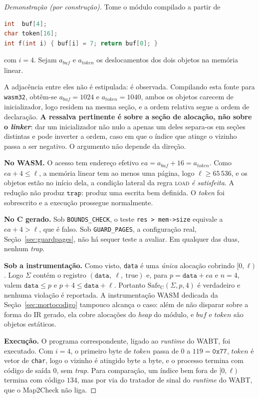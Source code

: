 \documentclass[11pt,a4paper]{article}
\theoremstyle{definition}
\newcommand{\Safe}{\mathrm{Safe}}
\newcommand{\code}[1]{\texttt{#1}}
\begin{document}
\begin{proof}[Demonstração (por construção)]
Tome o módulo compilado a partir de

\begin{lstlisting}[language=C]
int  buf[4];
char token[16];
int f(int i) { buf[i] = 7; return buf[0]; }
\end{lstlisting}

\noindent
com $i = 4$. Sejam $a_{\mathit{buf}}$ e $a_{\mathit{token}}$ os deslocamentos dos
dois objetos na memória linear.

A adjacência entre eles não é estipulada: é observada. Compilando esta fonte para
\code{wasm32}, obtêm-se $a_{\mathit{buf}} = 1024$ e $a_{\mathit{token}} = 1040$,
ambos os objetos carecem de inicializador, logo residem na mesma seção, e a
ordem relativa segue a ordem de declaração. \textbf{A ressalva pertinente é sobre
a seção de alocação, não sobre o \emph{linker}}: dar um inicializador não nulo a
apenas um deles separa-os em seções distintas e pode inverter a ordem, caso em
que o índice que atinge o vizinho passa a ser negativo. O argumento não depende
da direção.

\medskip
\noindent\textbf{No WASM.}
O acesso tem endereço efetivo $ea = a_{\mathit{buf}} + 16 = a_{\mathit{token}}$.
Como $ea + 4 \le \ell$, a memória linear tem ao menos uma página, logo
$\ell \ge 65\,536$, e os objetos estão no início dela, a condição lateral da
regra \textsc{load} \emph{é satisfeita}. A redução não produz $\mathtt{trap}$:
produz uma escrita bem definida. O \emph{token} foi sobrescrito e a execução
prossegue normalmente.

\medskip
\noindent\textbf{No C gerado.}
Sob \code{BOUNDS\_CHECK}, o teste \code{res > mem->size} equivale a
$ea + 4 > \ell$, que é falso. Sob \code{GUARD\_PAGES}, a configuração real,
Seção~\ref{sec:guardpages}, não há sequer teste a avaliar. Em qualquer das
duas, nenhum \emph{trap}.

\medskip
\noindent\textbf{Sob a instrumentação.}
Como visto, \code{data} é uma \emph{única} alocação cobrindo $[0,\ell)$. Logo
$\Sigma$ contém o registro $(\code{data},\ \ell,\ \mathrm{true})$ e, para
$p = \code{data} + ea$ e $n = 4$, valem $\code{data} \le p$ e
$p + 4 \le \code{data} + \ell$. Portanto $\Safe_{\mathrm{C}}(\Sigma, p, 4)$ é
verdadeiro e nenhuma violação é reportada. A instrumentação WASM dedicada da
Seção~\ref{sec:mortocodigo} tampouco alcança o caso: além de não disparar sobre
a forma do IR gerado, ela cobre alocações do \emph{heap} do módulo, e
$\mathit{buf}$ e $\mathit{token}$ são objetos estáticos.

\medskip
\noindent\textbf{Execução.}
O programa correspondente, ligado ao \emph{runtime} do WABT, foi executado. Com
$i = 4$, o primeiro byte de $\mathit{token}$ passa de $0$ a $119 = \mathtt{0x77}$,
$\mathit{token}$ é vetor de \code{char}, logo o vizinho é atingido byte a
byte, e o processo termina com código de saída $0$, sem \emph{trap}. Para
comparação, um índice bem fora de $[0,\ell)$ termina com código $134$, mas por
via do tratador de sinal do \emph{runtime} do WABT, que o Map2Check não liga.
\end{proof}
\end{document}
